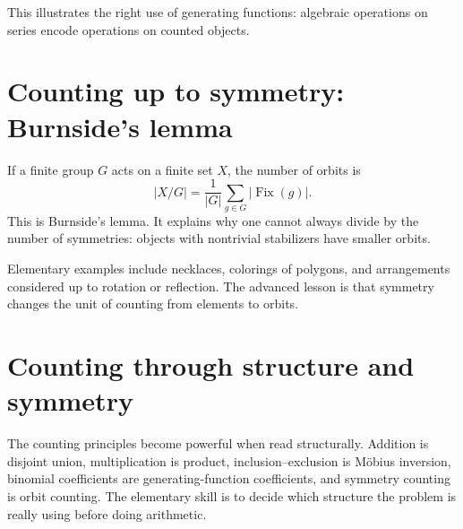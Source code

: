 This illustrates the right use of generating functions: algebraic operations on series encode operations on counted objects.

\section{Counting up to symmetry: Burnside's lemma}

If a finite group \(G\) acts on a finite set \(X\), the number of orbits is
\[
  |X/G|=\frac1{|G|}\sum_{g\in G}|\operatorname{Fix}(g)|.
\]
This is Burnside's lemma.  It explains why one cannot always divide by the number of symmetries: objects with nontrivial stabilizers have smaller orbits.

Elementary examples include necklaces, colorings of polygons, and arrangements considered up to rotation or reflection.  The advanced lesson is that symmetry changes the unit of counting from elements to orbits.

\section{Counting through structure and symmetry}

The counting principles become powerful when read structurally.  Addition is disjoint union, multiplication is product, inclusion--exclusion is Möbius inversion, binomial coefficients are generating-function coefficients, and symmetry counting is orbit counting.  The elementary skill is to decide which structure the problem is really using before doing arithmetic.
